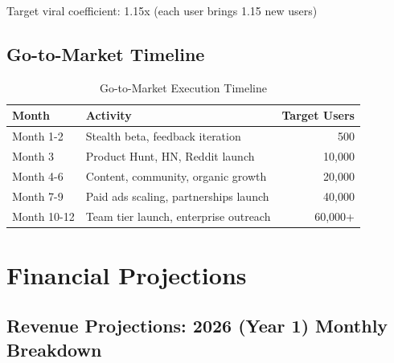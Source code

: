 \documentclass{report}
\begin{document}
Target viral coefficient: 1.15x (each user brings 1.15 new users)

\section{Go-to-Market Timeline}

\begin{table}[h]
\centering
\begin{tabular}{|l|l|r|}
\toprule
\textbf{Month} & \textbf{Activity} & \textbf{Target Users} \\
\midrule
Month 1-2 & Stealth beta, feedback iteration & 500 \\
Month 3 & Product Hunt, HN, Reddit launch & 10,000 \\
Month 4-6 & Content, community, organic growth & 20,000 \\
Month 7-9 & Paid ads scaling, partnerships launch & 40,000 \\
Month 10-12 & Team tier launch, enterprise outreach & 60,000+ \\
\bottomrule
\end{tabular}
\caption{Go-to-Market Execution Timeline}
\end{table}

\newpage

\chapter{Financial Projections}

\section{Revenue Projections: 2026 (Year 1) Monthly Breakdown}
\end{document}
